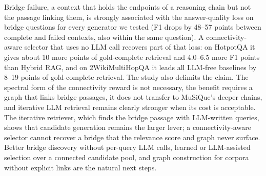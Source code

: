 Bridge failure, a context that holds the endpoints of a reasoning chain but not the passage linking them, is strongly associated with the answer-quality loss on bridge questions for every generator we tested (F1 drops by 48--57 points between complete and failed contexts, also within the same question). A connectivity-aware selector that uses no LLM call recovers part of that loss: on HotpotQA it gives about 10 more points of gold-complete retrieval and 4.0--6.5 more F1 points than Hybrid RAG, and on 2WikiMultiHopQA it leads all LLM-free baselines by 8--19 points of gold-complete retrieval. The study also delimits the claim. The spectral form of the connectivity reward is not necessary, the benefit requires a graph that links bridge passages, it does not transfer to MuSiQue's deeper chains, and iterative LLM retrieval remains clearly stronger when its cost is acceptable. The iterative retriever, which finds the bridge passage with LLM-written queries, shows that candidate generation remains the larger lever; a connectivity-aware selector cannot recover a bridge that the relevance score and graph never surface. Better bridge discovery without per-query LLM calls, learned or LLM-assisted selection over a connected candidate pool, and graph construction for corpora without explicit links are the natural next steps.
